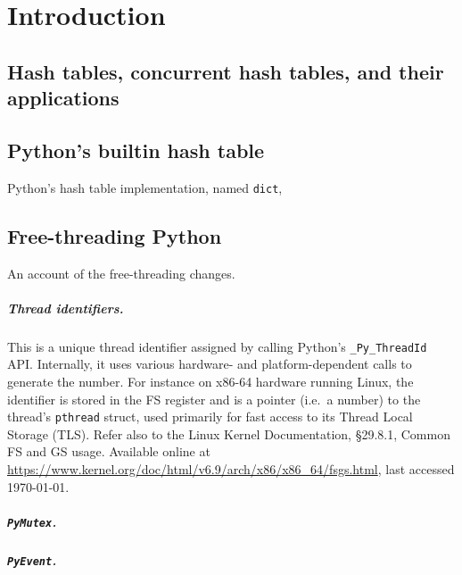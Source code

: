 \chapter{Introduction}\label{ch:introduction}


\section{Hash tables, concurrent hash tables, and their applications}\label{sec:hash-tables}

\cite{art-mp}

\section{Python's builtin hash table}\label{sec:dict-intro}

Python's hash table implementation, named \texttt{dict}, 

\cite{hettinger-dict}
\cite{dict-notes}
\cite{dict-comment-design}
\cite{dict-comment-hash}

\section{Free-threading Python}\label{sec:free-threading}

An account of the free-threading changes.

\cite{dabeaz-gil}
\cite{gross-doc}
\cite{mimalloc}

\paragraph{Thread identifiers.}
This is a unique thread identifier assigned by calling Python's \texttt{\_Py\_ThreadId} API\@.
Internally, it uses various hardware- and platform-dependent calls to generate the number.
For instance on x86-64 hardware running Linux, the identifier is stored in the FS register and is a pointer (i.e.\ a number) to the thread's \texttt{pthread} struct, used primarily for fast access to its Thread Local Storage (TLS).
Refer also to the Linux Kernel Documentation, \S29.8.1, Common FS and GS usage.
Available online at \url{https://www.kernel.org/doc/html/v6.9/arch/x86/x86_64/fsgs.html}, last accessed \today.

\paragraph{\texttt{PyMutex}.}

\paragraph{\texttt{PyEvent}.}

